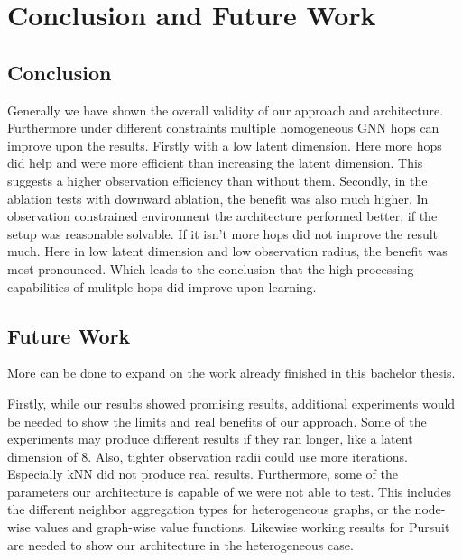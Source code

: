 
\chapter{Conclusion and Future Work}
\label{ch:Conclusion}


\section{Conclusion}
Generally we have shown the overall validity of our approach and architecture. Furthermore under different constraints multiple homogeneous GNN hops can improve upon the results. Firstly with a low latent dimension. Here more hops did help and were more efficient than increasing the latent dimension. This suggests a higher observation efficiency than without them. Secondly, in the ablation tests with downward ablation, the benefit was also much higher. In observation constrained environment the architecture performed better, if the setup was reasonable solvable. If it isn't more hops did not improve the result much. Here in low latent dimension and low observation radius, the benefit was most pronounced. Which leads to the conclusion that the high processing capabilities of mulitple hops did improve upon learning.

\section{Future Work}
More can be done to expand on the work already finished in this bachelor thesis.\par

Firstly, while our results showed promising results, additional experiments would be needed to show the limits and real benefits of our approach. Some of the experiments may produce different results if they ran longer, like a latent dimension of 8. Also, tighter observation radii could use more iterations. Especially kNN did not produce real results. Furthermore, some of the parameters our architecture is capable of we were not able to test. This includes the different neighbor aggregation types for heterogeneous graphs, or the node-wise values and graph-wise value functions. Likewise working results for Pursuit are needed to show our architecture in the heterogeneous case.

